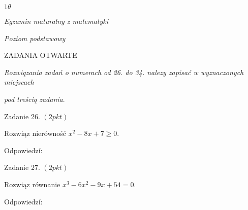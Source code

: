 \documentclass[a4paper,12pt]{article}
\begin{document}
$ 1\theta$

{\it Egzamin maturalny z matematyki}

{\it Poziom podstawowy}

ZADANIA OTWARTE

{\it Rozwiqzania zadań o numerach od 26. do 34. nalezy zapisać w wyznaczonych miejscach}

{\it pod treściq zadania}.

Zadanie 26. $(2pkt)$

Rozwiąz nierówność $x^{2}-8x+7\geq 0.$

Odpowiedzí:

Zadanie 27. $(2pkt)$

Rozwiąz równanie $x^{3}-6x^{2}-9x+54=0.$

Odpowiedzí:
\end{document}
